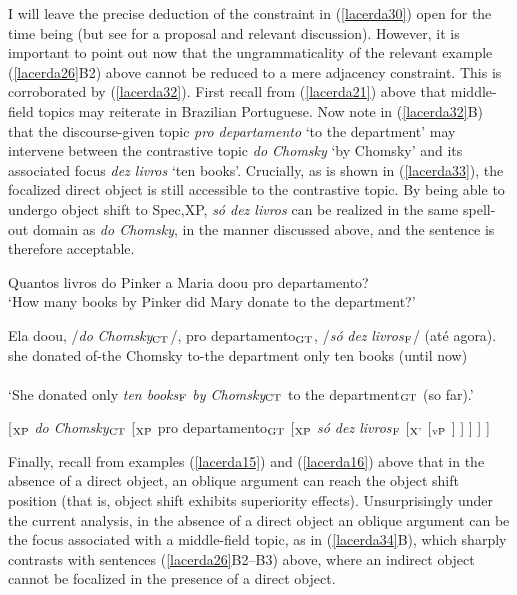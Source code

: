 \documentclass[output=paper]{langscibook}
\begin{document}
I will leave the precise deduction of the constraint in (\ref{lacerda30}) open for the time being (but see \citealt{Lacerda2020b} for a proposal and relevant discussion). However, it is important to point out now that the ungrammaticality of the relevant example (\ref{lacerda26}B2) above cannot be reduced to a mere adjacency constraint. This is corroborated by (\ref{lacerda32}). First recall from (\ref{lacerda21}) above that middle-field topics may reiterate in Brazilian Portuguese. Now note in (\ref{lacerda32}B) that the discourse-given topic \emph{pro departamento} ‘to the department’ may intervene between the contrastive topic \emph{do Chomsky} ‘by Chomsky’ and its associated focus \emph{dez livros} ‘ten books’. Crucially, as is shown in (\ref{lacerda33}), the focalized direct object is still accessible to the contrastive topic. By being able to undergo object shift to Spec,XP, \emph{só dez livros} can be realized in the same spell-out domain as \emph{do Chomsky}, in the manner discussed above, and the sentence is therefore acceptable.

\begin{exe}
\ex \label{lacerda32}
\begin{xlist}
 \label{lacerda32A}
Quantos livros do Pinker a Maria doou pro departamento?\\
‘How many books by Pinker did Mary donate to the department?’

 \label{lacerda32B}
\gll {}Ela 	doou, 	/\emph{do} 	\emph{Chomsky}$_{\textnormal{CT}}$/, 	pro 	departamento$_{\textnormal{GT}}$,	/\emph{só}	\emph{dez} 	\emph{livros}$_{\textnormal{F}}$/ 	(até 	agora).\\
she 	donated	of-the	Chomsky	to-the 	department	only 	ten 	books	(until	now)\\\\
‘She donated only \emph{ten books}$_{\textnormal{F}}$ \emph{by Chomsky}$_{\textnormal{CT}}$ to the department$_{\textnormal{GT}}$ (so far).’
\end{xlist}

\ex \label{lacerda33}
[$_{\textnormal{XP}}$ \emph{do Chomsky$_{\textnormal{CT}}$} [$_{\textnormal{XP}}$ pro departamento$_{\textnormal{GT}}$ [$_{\textnormal{XP}}$ \emph{só dez livros$_{\textnormal{F}}$} [$_{\textnormal{X'}}$ [$_{\textnormal{vP}}$ ] ] ] ] ]
\end{exe}

Finally, recall from examples (\ref{lacerda15}) and (\ref{lacerda16}) above that in the absence of a direct object, an oblique argument can reach the object shift position (that is, object shift exhibits superiority effects). Unsurprisingly under the current analysis, in the absence of a direct object an oblique argument can be the focus associated with a middle-field topic, as in (\ref{lacerda34}B), which sharply contrasts with sentences (\ref{lacerda26}B2–B3) above, where an indirect object cannot be focalized in the presence of a direct object.
\end{document}
